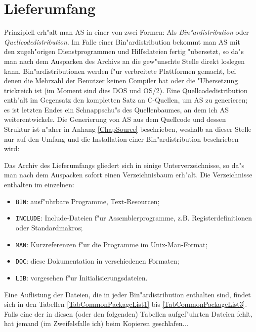 \documentclass[12pt,a4paper,twoside]{report}
\begin{document}

\section{Lieferumfang}

Prinzipiell erh"alt man AS in einer von zwei Formen: Als {\em
Bin"ardistribution} oder {\em Quellcodedistribution}.  Im Falle einer
Bin"ardistribution bekommt man AS mit den zugeh"origen Dienstprogrammen
und Hilfsdateien fertig "ubersetzt, so da"s man nach dem Auspacken des
Archivs an die gew"unschte Stelle direkt loslegen kann.
Bin"ardistributionen werden f"ur verbreitete Plattformen gemacht, bei
denen die Mehrzahl der Benutzer keinen Compiler hat oder die "Ubersetzung
trickreich ist (im Moment sind dies DOS und OS/2).  Eine
Quellcodedistribution enth"alt im Gegensatz den kompletten Satz an
C-Quellen, um AS zu generieren; es ist letzten Endes ein Schnappschu"s
des Quellenbaumes, an dem ich AS weiterentwickele.  Die Generierung von AS
aus dem Quellcode und dessen Struktur ist n"aher in Anhang
\ref{ChapSource} beschrieben, weshalb an dieser Stelle nur auf den
Umfang und die Installation einer Bin"ardistribution beschrieben wird:

Das Archiv des Lieferumfangs gliedert sich in einige Unterverzeichnisse,
so da"s man nach dem Auspacken sofort einen Verzeichnisbaum erh"alt.  Die
Verzeichnisse enthalten im einzelnen:
\begin{itemize}
\item{{\tt BIN}: ausf"uhrbare Programme, Text-Resourcen;}
\item{{\tt INCLUDE}: Include-Dateien f"ur Assemblerprogramme, z.B.
      Registerdefinitionen oder Standardmakros;}
\item{{\tt MAN}: Kurzreferenzen f"ur die Programme im Unix-Man-Format;}
\item{{\tt DOC}: diese Dokumentation in verschiedenen Formaten;}
\item{{\tt LIB}: vorgesehen f"ur Initialisierungsdateien.}
\end{itemize}
Eine Auflistung der Dateien, die in jeder Bin"ardistribution enthalten
sind, findet sich in den Tabellen \ref{TabCommonPackageList1} bis
\ref{TabCommonPackageList3}.  Falls eine der in diesen (oder den
folgenden) Tabellen aufgef"uhrten Dateien fehlt, hat jemand (im
Zweifelsfalle ich) beim Kopieren geschlafen...
\end{document}
